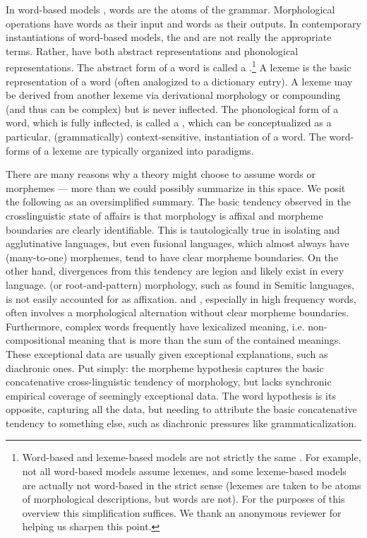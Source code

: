 \documentclass[output=paper,hidelinks]{langscibook}
\begin{document}
In word-based models \citep{aronoff76}, words are the atoms of the grammar.
Morphological operations have words as their input and words as their
outputs.  In contemporary instantiations of word-based models, the
 and  are not really the appropriate
terms. Rather,  have both abstract representations and
phonological representations. The abstract form of a word is called a
.\footnote{Word-based and lexeme-based models are not
  strictly the same \citep[7]{aronoff94}. For example, not all word-based
  models assume lexemes, and some lexeme-based models are actually not
  word-based in the strict sense (lexemes are taken to be atoms of morphological descriptions, but words are not). For the purposes of this overview this
  simplification suffices. We thank an anonymous reviewer for helping
  us sharpen this point.}  A lexeme is the basic  representation of a
word (often analogized to a dictionary entry).  A lexeme may be
derived from another lexeme via derivational morphology or compounding
(and thus can be complex) but is never inflected.  The phonological
form of 
a word, which is fully inflected, is called a , which
can be conceptualized as a particular, (grammatically)
context-sensitive, instantiation of a word.  The word-forms of a
lexeme are typically organized into paradigms.

\begin{sloppypar}
  There are many reasons why a theory might choose to assume words or
  morphemes --- more than we could possibly summarize in this space.
  We posit the following as an oversimplified summary. The basic
  tendency observed in the crosslinguistic state of affairs is that
  morphology is affixal and morpheme boundaries are clearly
  identifiable.  This is tautologically true in isolating and
  agglutinative languages, but even fusional languages, which almost
  always have  (many-to-one) morphemes, tend to
  have clear morpheme boundaries.  On the other hand, divergences from
  this tendency are legion and likely exist in every language.
   (or root-and-pattern) morphology, such as found in
  Semitic languages, is not easily accounted for as
  affixation.  and ,
  especially in high frequency words, often involves a morphological
  alternation without clear morpheme boundaries.  Furthermore, complex
  words frequently have lexicalized meaning, i.e. non-compositional
  meaning that is more than the sum of the contained meanings.  These
  exceptional data are usually given exceptional explanations, such as
  diachronic ones.  Put simply: the morpheme hypothesis captures the
  basic concatenative cross-linguistic tendency of morphology, but
  lacks synchronic empirical coverage of seemingly exceptional data.
  The word hypothesis is its opposite, capturing all the data, but
  needing to attribute the basic concatenative tendency to something
  else, such as diachronic pressures like grammaticalization.
\end{sloppypar}
\end{document}
